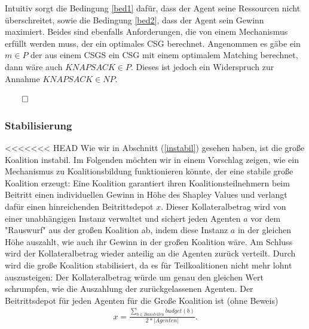 Intuitiv sorgt die Bedingung \ref{bed1} dafür, dass der Agent seine Ressourcen nicht überschreitet, sowie die Bedingung \ref{bed2}, dass der Agent sein Gewinn maximiert. Beides sind ebenfalls Anforderungen, die von einem Mechanismus erfüllt werden muss, der ein optimales CSG berechnet.
Angenommen es gäbe ein $m\in P$ der aus einem CSGS ein CSG mit einem optimalem Matching berechnet, dann wäre auch $KNAPSACK \in P$. Dieses ist jedoch ein Widerspruch zur Annahme $KNAPSACK \in NP$.
\begin{flushright}
  $\qed$
\end{flushright}

\subsubsection*{Stabilisierung}
\label{stabilisierung}
<<<<<<< HEAD
Wie wir in Abschnitt (\ref{instabil}) gesehen haben, ist die große Koalition instabil. Im Folgenden möchten wir in einem Vorschlag zeigen, wie ein Mechanismus zu Koalitionsbildung funktionieren könnte, der eine stabile große Koalition erzeugt:
Eine Koalition garantiert ihren Koalitionsteilnehmern beim Beitritt einen individuellen Gewinn in Höhe des Shapley Values und verlangt dafür einen hinreichenden Beitrittsdepot $x$. Dieser Kollateralbetrag wird von einer unabhängigen Instanz verwaltet und sichert jeden Agenten $a$ vor dem "Rauswurf" aus der großen Koalition ab, indem diese Instanz $a$ in der gleichen Höhe auszahlt, wie auch ihr Gewinn in der großen Koalition wäre.
Am Schluss wird der Kollateralbetrag wieder anteilig an die Agenten zurück verteilt. Durch wird die große Koalition stabilisiert, da es für Teilkoalitionen nicht mehr lohnt auszusteigen: Der Kollateralbetrag würde um genau den gleichen Wert schrumpfen, wie die Auszahlung der zurückgelassenen Agenten. Der Beitrittsdepot für jeden Agenten für die Große Koalition ist (ohne Beweis)
\begin{align}
  x=\frac{\sum_{b\in Baustellen} budget(b)}{2*|Agenten|}.
\end{align}

